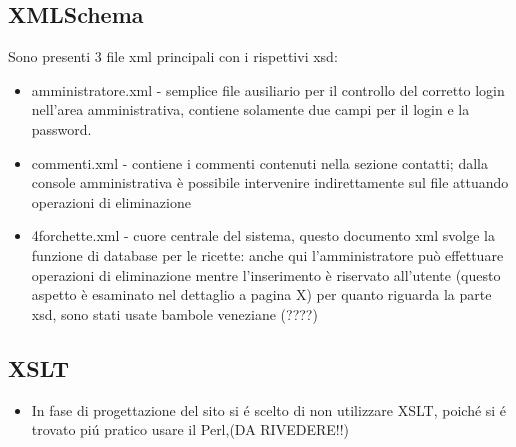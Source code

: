 \documentclass[12pt]{article}
\begin{document}
		\subsection{XMLSchema}
		Sono presenti 3 file xml principali con i rispettivi xsd:

		\begin{itemize}
		\item  amministratore.xml - semplice file ausiliario per il controllo del corretto login nell'area amministrativa, contiene solamente due campi per il login e la password.
		\end{itemize}
		\begin{itemize}
		\item commenti.xml - contiene i commenti contenuti nella sezione contatti; dalla console amministrativa è possibile intervenire indirettamente sul file attuando operazioni di eliminazione
		\end{itemize}
		\begin{itemize}
		\item 4forchette.xml - cuore centrale del sistema, questo documento xml svolge la funzione di database per le ricette: anche qui l'amministratore può effettuare operazioni di eliminazione mentre l'inserimento è riservato all'utente (questo aspetto è esaminato nel dettaglio a pagina X)
		per quanto riguarda la parte xsd, sono stati usate bambole veneziane (????)
		\end{itemize}
			
		\subsection{XSLT}
			\begin{itemize}
				\item In fase di progettazione del sito si \'e scelto di non utilizzare XSLT, poich\'e si \'e trovato pi\'u pratico usare il Perl,(DA RIVEDERE!!) 
			\end{itemize}
			
\end{document}
